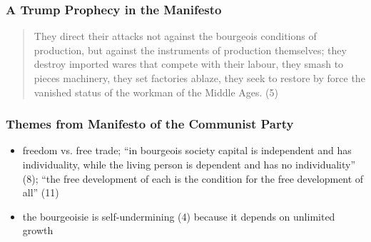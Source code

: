 \documentclass[xcolor=dvipsnames]{beamer}
\begin{document}
\begin{frame}
  \frametitle{A Trump Prophecy in the Manifesto}
  \begin{quote}
    They direct their attacks not against the bourgeois conditions of
    production, but against the instruments of production themselves;
    they destroy imported wares that compete with their labour, they
    smash to pieces machinery, they set factories ablaze, they seek to
    restore by force the vanished status of the workman of the Middle
    Ages. (5)
  \end{quote}
\end{frame}

\begin{frame}
  \frametitle{Themes from Manifesto of the Communist Party}
  \begin{itemize}
  \item<1-> freedom vs. free trade; ``in bourgeois society capital is
    independent and has individuality, while the living person is
    dependent and has no individuality'' (8); ``the free development
    of each is the condition for the free development of all'' (11)
  \item<2-> the bourgeoisie is self-undermining (4) because it depends
    on unlimited growth
  \end{itemize}
\end{frame}

\end{document}
